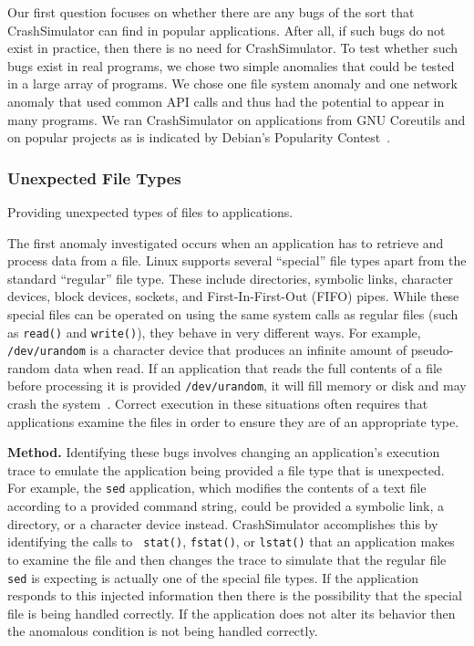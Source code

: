 Our first question focuses on whether there are any bugs of the sort that
CrashSimulator can find in popular applications.  After all, if such bugs
do not exist in practice, then there is no need for CrashSimulator.
To test whether such bugs exist in real programs, we 
chose two simple anomalies that could be tested in a large
array of programs.  We chose one file system anomaly and one network anomaly 
that used common API calls and thus had the potential to appear in
many programs.  We ran CrashSimulator on applications from GNU Coreutils and
on popular projects as is indicated by Debian's Popularity Contest~\cite{DebPopCon}.

\subsubsection{Unexpected File Types} 
\label{sec-file-type-bugs}
Providing unexpected types of files to
applications.

The first anomaly investigated occurs when an
application has to retrieve and process data from a file.  Linux supports
several ``special'' file types apart from the standard ``regular'' file type.
These include directories, symbolic links, character devices, block devices,
sockets, and First-In-First-Out (FIFO) pipes.  While these special files can
be operated on using the same system calls as regular files 
(such as {\tt read()} and {\tt write()}), they behave in very different
ways.  For example, {\tt /dev/urandom} is a character device that produces
an infinite amount of pseudo-random data when read.
If an application that reads the full contents of a file
before processing it is provided {\tt /dev/urandom}, it will fill memory
or disk and may crash the system~\cite{YumAptEndless}.
Correct execution in these situations
often requires that applications 
examine the files in order to ensure they are of an appropriate type.

{\bf Method.}  Identifying these bugs involves changing an application's
execution trace to emulate the application being provided a file type that is
unexpected.  For example, the {\tt sed} application, which modifies the contents
of a text file according to a provided command string, could be provided
a symbolic link, a directory, or a character device
instead.  CrashSimulator accomplishes this by identifying the calls to {\tt
  stat()}, {\tt fstat()}, or {\tt lstat()} that an application makes to examine
the file and then changes the trace to simulate that the regular file {\tt sed}
is expecting is actually one of the special file types.  If the application
responds to this injected information then there is the possibility that the
special file is being handled correctly.  If the application does not alter its
behavior then the anomalous condition is not being handled correctly.

